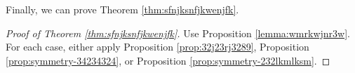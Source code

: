 Finally, we can prove Theorem \ref{thm:sfnjksnfjkwenjfk}.

\begin{proof}[Proof of Theorem \ref{thm:sfnjksnfjkwenjfk}]
    Use Proposition \ref{lemma:wmrkwjnr3w}. For each case, either apply Proposition \ref{prop:32j23rj3289}, Proposition \ref{prop:symmetry-34234324}, or Proposition \ref{prop:symmetry-232lkmlksm}.
\end{proof}